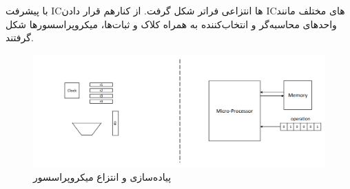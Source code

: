 \begin{flushright}
    با پیشرفت ICها انتزاعی فراتر شکل گرفت.
    از کنارهم قرار دادن ICهای مختلف مانند واحدهای محاسبه‌گر و انتخاب‌کننده به همراه کلاک و ثبات‌ها، میکروپراسسورها شکل گرفتند.

    \begin{figure}[H]
               \centering
               \includegraphics[scale=0.3]{source/microprocessor-imp&abs}
               \caption{پیاده‌سازی و انتزاع میکروپراسسور}
               \label{fig:microprocessor-imp&abs}
    \end{figure}


\end{flushright}